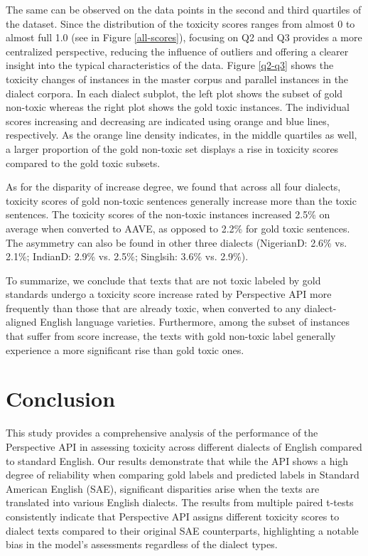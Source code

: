 \documentclass[11pt]{article}
\begin{document}
The same can be observed on the data points in the second and third quartiles of the dataset. Since the distribution of the toxicity scores ranges from almost 0 to almost full 1.0 (see in Figure \ref{all-scores}), focusing on Q2 and Q3 provides a more centralized perspective, reducing the influence of outliers and offering a clearer insight into the typical characteristics of the data. Figure \ref{q2-q3} shows the toxicity changes of instances in the master corpus and parallel instances in the dialect corpora. In each dialect subplot, the left plot shows the subset of gold non-toxic whereas the right plot shows the gold toxic instances. The individual scores increasing and decreasing are indicated using orange and blue lines, respectively. As the orange line density indicates, in the middle quartiles as well, a larger proportion of the gold non-toxic set displays a rise in toxicity scores compared to the gold toxic subsets.

As for the disparity of increase degree, we found that across all four dialects, toxicity scores of gold non-toxic sentences generally increase more than the toxic sentences. The toxicity scores of the non-toxic instances increased 2.5\% on average when converted to AAVE, as opposed to 2.2\% for gold toxic sentences. The asymmetry can also be found in other three dialects (NigerianD: 2.6\% vs. 2.1\%; IndianD: 2.9\% vs. 2.5\%; Singlsih: 3.6\% vs. 2.9\%).

To summarize, we conclude that texts that are not toxic labeled by gold standards undergo a toxicity score increase rated by Perspective API more frequently than those that are already toxic, when converted to any dialect-aligned English language varieties. Furthermore, among the subset of instances that suffer from score increase, the texts with gold non-toxic label generally experience a more significant rise than gold toxic ones.

\section{Conclusion}

This study provides a comprehensive analysis of the performance of the Perspective API in assessing toxicity across different dialects of English compared to standard English. Our results demonstrate that while the API shows a high degree of reliability when comparing gold labels and predicted labels in Standard American English (SAE), significant disparities arise when the texts are translated into various English dialects. The results from multiple paired t-tests consistently indicate that Perspective API assigns different toxicity scores to dialect texts compared to their original SAE counterparts, highlighting a notable bias in the model's assessments regardless of the dialect types.
\end{document}
